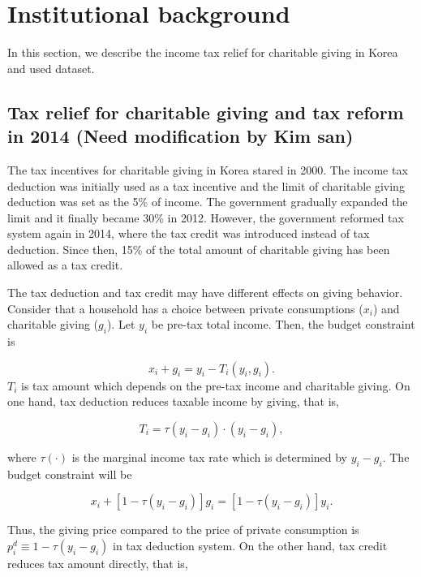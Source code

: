 \documentclass[ review  , 3p ]{elsarticle}
\begin{document}
  \hypertarget{institutional-background}{%
  \section{Institutional background}\label{institutional-background}}
  
  In this section, we describe the income tax relief for charitable giving in Korea and used dataset.
  
  \hypertarget{tax-relief-for-charitable-giving-and-tax-reform-in-2014-need-modification-by-kim-san}{%
  \subsection{Tax relief for charitable giving and tax reform in 2014 (Need modification by Kim san)}\label{tax-relief-for-charitable-giving-and-tax-reform-in-2014-need-modification-by-kim-san}}
  
  The tax incentives for charitable giving in Korea stared in 2000. The income tax deduction was initially used as a tax incentive and the limit of charitable giving deduction was set as the 5\% of income. The government gradually expanded the limit and it finally became 30\% in 2012. However, the government reformed tax system again in 2014, where the tax credit was introduced instead of tax deduction. Since then, 15\% of the total amount of charitable giving has been allowed as a tax credit.
  
  The tax deduction and tax credit may have different effects on giving behavior.
  Consider that a household has a choice between private consumptions (\(x_i\)) and charitable giving (\(g_i\)). Let \(y_i\) be pre-tax total income.
  Then, the budget constraint is
  
  \[
      x_i + g_i = y_i - T_i(y_i, g_i).
  \]
  \(T_i\) is tax amount which depends on the pre-tax income and charitable giving.
  On one hand, tax deduction reduces taxable income by giving, that is,
  
  \[
      T_i = \tau(y_i - g_i) \cdot (y_i - g_i),
  \]
  
  where \(\tau(\cdot)\) is the marginal income tax rate which is determined by \(y_i - g_i\). The budget constraint will be
  
  \[
      x_i + [1 - \tau(y_i - g_i)]g_i = [1 - \tau(y_i - g_i)] y_i.
  \]
  
  Thus, the giving price compared to the price of private consumption is \(p_i^{d} \equiv 1 - \tau(y_i - g_i)\) in tax deduction system.
  On the other hand, tax credit reduces tax amount directly, that is,
  
\end{document}
